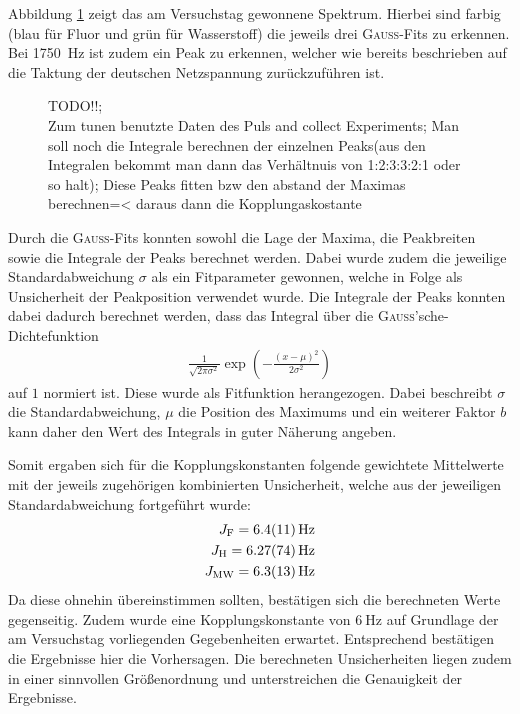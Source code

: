 Abbildung \ref{fig:JKopplungExp} zeigt das am Versuchstag gewonnene Spektrum.
Hierbei sind farbig (blau für Fluor und grün für Wasserstoff) die jeweils drei \textsc{Gauss}-Fits zu erkennen. 
Bei \SI{1750}{\hertz} ist zudem ein Peak zu erkennen, welcher wie bereits beschrieben auf die Taktung der deutschen Netzspannung zurückzuführen ist.

\begin{figure}[H]
    \centering
    
    \caption{TODO!!;\\
    Zum tunen benutzte Daten des Puls and collect Experiments; Man soll noch die Integrale berechnen der einzelnen Peaks(aus den Integralen bekommt man dann das Verhältnuis von 1:2:3:3:2:1 oder so halt); Diese Peaks fitten bzw den abstand der Maximas berechnen=< daraus dann die Kopplungaskostante}
    \label{fig:JKopplungExp}
\end{figure}

Durch die \textsc{Gauss}-Fits konnten sowohl die Lage der Maxima, die Peakbreiten sowie die Integrale der Peaks berechnet werden.
Dabei wurde zudem die jeweilige Standardabweichung $\sigma$ als ein Fitparameter gewonnen, welche in Folge als Unsicherheit der Peakposition verwendet wurde.
Die Integrale der Peaks konnten dabei dadurch berechnet werden, dass das Integral über die \textsc{Gauss}'sche-Dichtefunktion
\begin{align}
    \frac{1}{\sqrt{2 \pi \sigma^2}} \exp{\left(-\frac{\left(x-\mu\right)^2}{2 \sigma^2}\right)}
\end{align}
auf $1$ normiert ist.
Diese wurde als Fitfunktion herangezogen.
Dabei beschreibt $\sigma$ die Standardabweichung, $\mu$ die Position des Maximums und ein weiterer Faktor $b$ kann daher den Wert des Integrals in guter Näherung angeben.

Somit ergaben sich für die Kopplungskonstanten folgende gewichtete Mittelwerte mit der jeweils zugehörigen kombinierten Unsicherheit, welche aus der jeweiligen Standardabweichung fortgeführt wurde:
\begin{align*}
    J_{\text{F}} = \SI{6.4 \pm 1.1}{\hertz} \\
    J_{\text{H}} = \SI{6.27 \pm 0.74}{\hertz} \\
    J_{\text{MW}} = \SI{6.3 \pm 1.3}{\hertz}
\end{align*}
Da diese ohnehin übereinstimmen sollten, bestätigen sich die berechneten Werte gegenseitig.
Zudem wurde eine Kopplungskonstante von $\SI{6}{\hertz}$ auf Grundlage der am Versuchstag vorliegenden Gegebenheiten erwartet.
Entsprechend bestätigen die Ergebnisse hier die Vorhersagen.
Die berechneten Unsicherheiten liegen zudem in einer sinnvollen Größenordnung und unterstreichen die Genauigkeit der Ergebnisse.

